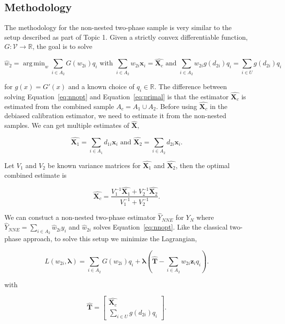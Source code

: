 \documentclass[12pt]{article}
\DeclareMathOperator*{\argmin}{arg\,min}
\renewcommand{\bf}[1]{\mathbf{#1}}
\begin{document}
\subsection{Methodology}

The methodology for the non-nested two-phase sample is very similar to the setup
described as part of Topic 1. Given a strictly convex differentiable function,
$G: \mathcal{V} \to \mathbb{R}$, the goal is to solve

\begin{equation}\label{eq:nnopt}
\hat w_2 = \argmin_w \sum_{i \in A_2} G\left(w_{2i}\right) q_i 
\text{ with } 
\sum_{i \in A_2} w_{2i} \bf x_i = \hat{\bf X_{c}} \text{ and } 
\sum_{i \in A_2} w_{2i} g(d_{2i}) q_i = \sum_{i \in U} g(d_{2i}) q_i
\end{equation}

for $g(x) = G'(x)$ and a known choice of $q_i \in \mathbb{R}$. 
The difference
between solving Equation~\ref{eq:nnopt} and Equation~\ref{eq:primal} is that the
estimator $\hat{\bf X_c}$ is estimated from the combined sample $A_c= A_1 \cup
A_2$. Before using $\hat{\bf X_c}$ in the debiased calibration estimator, we
need to estimate it from the non-nested samples. We can get multiple estimates
of $\hat{\bf X}$, 

$$\hat{\bf X_1} = \sum_{i \in A_1} d_{1i} \bf x_i \text{ and }
\hat{\bf X_2} = \sum_{i \in A_2} d_{2i} \bf x_i.$$

Let $V_1$ and $V_2$ be known variance matrices for $\hat{\bf X_1}$ and 
$\hat{\bf X_2}$, then the optimal combined estimate is 

$$\hat{\bf X_c} = \frac{V_1^{-1} \hat{\bf X_1} + V_2^{-1} 
\hat{\bf X_2}}{V_1^{-1} + V_2^{-1}}.$$

We can constuct a non-nested two-phase estimator $\hat Y_{NNE}$ for $Y_N$ where
$\hat Y_{NNE} = \sum_{i \in A_2} \hat w_{2i} y_i$ and $\hat w_{2i}$ solves
Equation~\ref{eq:nnopt}. Like the classical two-phase approach, to solve this
setup we minimize the Lagrangian,

\begin{equation}\label{eq:legragedc2}
  L(w_{2i}, \bm \lambda) = \sum_{i \in A_2} G(w_{2i}) q_i + 
  \bm \lambda \left( \hat{\bf T} - \sum_{i \in A_2} w_{2i} \bf z_i q_i\right).
\end{equation}

with 

$$\hat{\bf T} = 
\begin{bmatrix}
  \hat{\bf X_c} \\ \sum_{i \in U} g(d_{2i}) q_i
\end{bmatrix}.
$$
\end{document}
